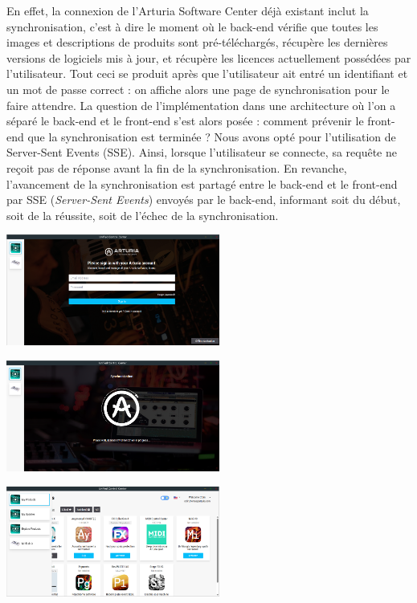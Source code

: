 \documentclass[francais]{rapportPFE}  %
\begin{document}
En effet, la connexion de l'Arturia Software Center déjà existant inclut la synchronisation, c'est à dire le moment où le back-end vérifie que toutes les images et descriptions de produits sont pré-téléchargés, récupère les dernières versions de logiciels mis à jour, et récupère les licences actuellement possédées par l'utilisateur. Tout ceci se produit après que l'utilisateur ait entré un identifiant et un mot de passe correct : on affiche alors une page de synchronisation pour le faire attendre. La question de l'implémentation dans une architecture où l'on a séparé le back-end et le front-end s'est alors posée : comment prévenir le front-end que la synchronisation est terminée ? Nous avons opté pour l'utilisation de Server-Sent Events (SSE). Ainsi, lorsque l'utilisateur se connecte, sa requête ne reçoit pas de réponse avant la fin de la synchronisation. En revanche, l'avancement de la synchronisation est partagé entre le back-end et le front-end par SSE (\textit{Server-Sent Events}) envoyés par le back-end, informant soit du début, soit de la réussite, soit de l'échec de la synchronisation.
\begin{center}
    \centering
    \begin{minipage}{.5\textwidth}
    \centering
    \includegraphics[width=7cm]{graphics/disconnected.png}
    \label{fig:test1}
    \end{minipage}%
    \begin{minipage}{.5\textwidth}
    \centering
    \includegraphics[width=7cm]{graphics/sync.png}
    \label{fig:test2}
    \end{minipage}
    \begin{minipage}{.5\textwidth}
    \centering
    \includegraphics[width=7cm]{graphics/connected.png}
    \label{fig:test2}
    \end{minipage}
\end{center}
\end{document}
